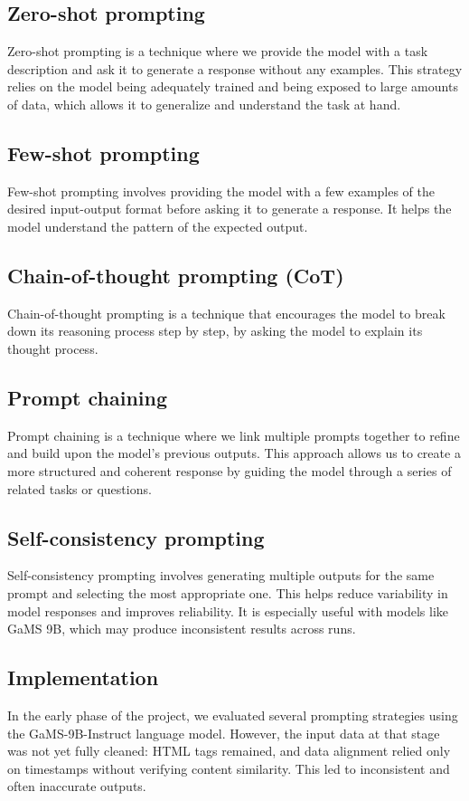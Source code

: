 \documentclass[fleqn,moreauthors,10pt]{ds_report}
\begin{document}
\subsection*{Zero-shot prompting}
Zero-shot prompting is a technique where we provide the model with a task description and ask it to generate a response without any examples.
This strategy relies on the model being adequately trained and being exposed to large amounts of data, which allows it to generalize and understand the task at hand.

\subsection*{Few-shot prompting}
Few-shot prompting involves providing the model with a few examples of the desired input-output format before asking it to generate a response.
It helps the model understand the pattern of the expected output.

\subsection*{Chain-of-thought prompting (CoT)}
Chain-of-thought prompting is a technique that encourages the model to break down its reasoning process step by step, by asking the model to explain its thought process.

\subsection*{Prompt chaining}
Prompt chaining is a technique where we link multiple prompts together to refine and build upon the model's previous outputs.
This approach allows us to create a more structured and coherent response by guiding the model through a series of related tasks or questions.

\subsection*{Self-consistency prompting} Self-consistency prompting involves generating multiple outputs for the same prompt and selecting the most appropriate one. This helps reduce variability in model responses and improves reliability. It is especially useful with models like GaMS 9B, which may produce inconsistent results across runs.

\subsection*{Implementation}
In the early phase of the project, we evaluated several prompting strategies using the GaMS-9B-Instruct language model. However, the input data at that stage was not yet fully cleaned: HTML tags remained, and data alignment relied only on timestamps without verifying content similarity. This led to inconsistent and often inaccurate outputs.\newline
\end{document}
